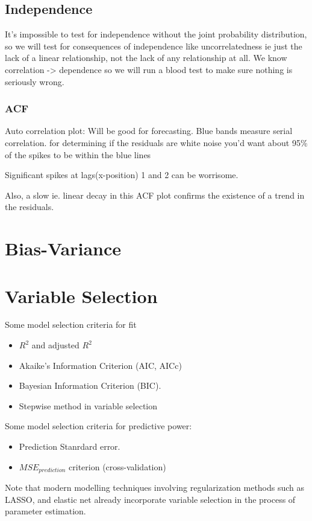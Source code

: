 \documentclass{article}
\begin{document}
\subsection{Independence}
It's impossible to test for independence without the joint probability distribution, so we will test for consequences of independence like  uncorrelatedness ie just the lack of a linear relationship, not the lack of any relationship at all. We know correlation -> dependence so we will run a blood test to make sure nothing is seriously wrong. 
\subsubsection{ACF}
Auto correlation plot: Will be good for forecasting. Blue bands measure serial correlation. for determining if the residuals are white noise you'd want about 95\% of the spikes to be within the blue lines 

Significant spikes at lags(x-position) 1 and 2 can be worrisome. 

Also, a slow ie. linear decay in this ACF plot confirms the existence of a trend in the residuals. 


\section{Bias-Variance}
\section{Variable Selection}
Some model selection criteria for fit
\begin{itemize}
\item $R^2$ and adjusted $R^2$
\item Akaike's Information Criterion (AIC, AICc)
\item Bayesian Information Criterion (BIC). 
\item Stepwise method in variable selection \
\end{itemize}

Some model selection criteria for predictive power: 
\begin{itemize}
\item Prediction Stanrdard error. 
\item $MSE_{prediction}$ criterion (cross-validation)
\end{itemize}

Note that modern modelling techniques involving regularization methods such as LASSO, and elastic net  already incorporate variable selection  in the process of parameter estimation. 
\end{document}
